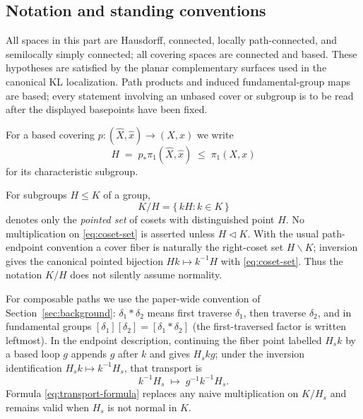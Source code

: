 \subsection*{Notation and standing conventions}

All spaces in this part are Hausdorff, connected, locally path-connected,
and semilocally simply connected; all covering spaces are connected and
based.  These hypotheses are satisfied by the planar complementary
surfaces used in the canonical KL localization.  Path products and
induced fundamental-group maps are based; every statement involving an
unbased cover or subgroup is to be read after the displayed basepoints
have been fixed.

For a based covering \( p\colon(\widehat X,\widehat x)\to(X,x) \) we write
\[
  H \;=\; p_*\pi_1(\widehat X,\widehat x)\;\leq\;\pi_1(X,x)
\]
for its characteristic subgroup.

For subgroups \( H\leq K \) of a group,
\begin{equation}\label{eq:coset-set}
  K/H=\{\,kH : k\in K\,\}
\end{equation}
denotes only the \emph{pointed set} of cosets with distinguished point
\( H \).  No multiplication on \eqref{eq:coset-set} is asserted unless
\( H\triangleleft K \).  With the usual path-endpoint convention a cover
fiber is naturally the right-coset set \( H\backslash K \); inversion
gives the canonical pointed bijection \( Hk\longmapsto k^{-1}H \) with
\eqref{eq:coset-set}.  Thus the notation \( K/H \) does not silently
assume normality.

For composable paths we use the paper-wide convention of
Section~\ref{sec:background}: \( \delta_1*\delta_2 \) means first
traverse \( \delta_1 \), then traverse \( \delta_2 \), and in
fundamental groups \( [\delta_1][\delta_2]=[\delta_1*\delta_2] \)
(the first-traversed factor is written leftmost).  In the endpoint
description, continuing the fiber point labelled \( H_sk \) by a based
loop \( g \) appends \( g \) after \( k \) and gives \( H_skg \); under
the inversion identification
\( H_sk\mapsto k^{-1}H_s \), that transport is
\begin{equation}\label{eq:transport-formula}
  k^{-1}H_s\;\longmapsto\; g^{-1}k^{-1}H_s .
\end{equation}
Formula \eqref{eq:transport-formula} replaces any naive multiplication on
\( K/H_s \) and remains valid when \( H_s \) is not normal in \( K \).


